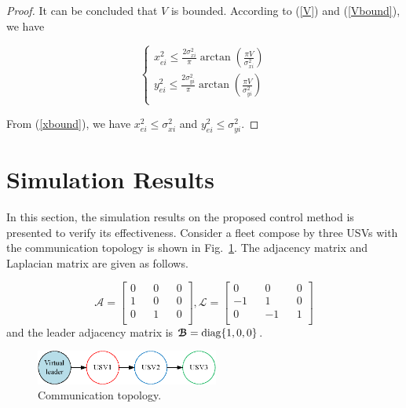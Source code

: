 \documentclass[conference,letterpaper,10.5pt]{IEEEtran}
\begin{document}
\begin{proof}
	It can be concluded that $V$ is bounded. According to (\ref{V}) and (\ref{Vbound}), we have
	
	\begin{equation}\label{xbound}
		\left\{
		\begin{aligned}
			x_{ei}^2\leq \frac{2\sigma^2_{xi}}{\pi}\arctan(\frac{\pi V}{\sigma^2_{xi}})\\
			y_{ei}^2\leq \frac{2\sigma^2_{yi}}{\pi}\arctan(\frac{\pi V}{\sigma^2_{yi}})\\
		\end{aligned}
		\right.
	\end{equation}
	
	From (\ref{xbound}), we have $x^2_{ei}\leq \sigma^2_{xi}$ and $y^2_{ei}\leq \sigma^2_{yi}$. \end{proof}

\section{Simulation Results}

In this section, the simulation results on the proposed control method is presented to verify its effectiveness. Consider a fleet compose by three USVs with the communication topology is shown in Fig.~\ref{communication}. The adjacency matrix and Laplacian matrix are given as follows.

\begin{equation}
	\boldsymbol{\mathcal{A}}=\begin{bmatrix}
		0 && 0 && 0\\
		1 && 0 && 0\\
		0 && 1 && 0\\
	\end{bmatrix},
	\boldsymbol{\mathcal{L}}=\begin{bmatrix}
		0 && 0 && 0\\
		-1 && 1 && 0\\
		0 && -1 && 1\\
	\end{bmatrix}
\end{equation}
and the leader adjacency matrix is $\boldsymbol{\mathcal{B}}={\rm diag\{1,0,0\}}$. 

\begin{figure}[!htb]
	\centering
	\includegraphics[width=6cm]{communication.eps}
	\caption{Communication topology.}
	\label{communication}
\end{figure}
\end{document}
